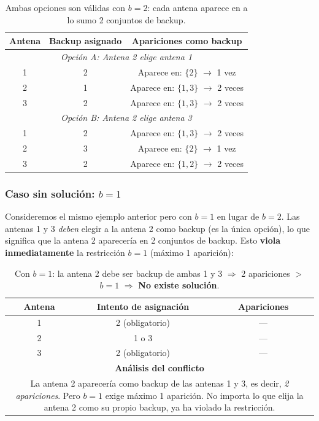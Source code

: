 \begin{table}[h]
\centering
\begin{tabular}{|c|c|c|}
\hline
\textbf{Antena} & \textbf{Backup asignado} & \textbf{Apariciones como backup} \\
\hline
\multicolumn{3}{|c|}{\textit{Opción A: Antena 2 elige antena 1}} \\
\hline
1 & 2 & Aparece en: $\{2\}$ $\rightarrow$ 1 vez \\
\hline
2 & 1 & Aparece en: $\{1, 3\}$ $\rightarrow$ 2 veces \\
\hline
3 & 2 & Aparece en: $\{1, 3\}$ $\rightarrow$ 2 veces \\
\hline
\multicolumn{3}{|c|}{\textit{Opción B: Antena 2 elige antena 3}} \\
\hline
1 & 2 & Aparece en: $\{1, 3\}$ $\rightarrow$ 2 veces \\
\hline
2 & 3 & Aparece en: $\{2\}$ $\rightarrow$ 1 vez \\
\hline
3 & 2 & Aparece en: $\{1, 2\}$ $\rightarrow$ 2 veces \\
\hline
\end{tabular}
\caption{Ambas opciones son válidas con $b=2$: cada antena aparece en a lo sumo 2 conjuntos de backup.}
\label{tab:ejemplo_soluciones}
\end{table}

\subsubsection{Caso sin solución: $b=1$}

Consideremos el mismo ejemplo anterior pero con $b=1$ en lugar de $b=2$. Las antenas 1 y 3 \textit{deben} elegir a la antena 2 como backup (es la única opción), lo que significa que la antena 2 aparecería en 2 conjuntos de backup. Esto \textbf{viola inmediatamente} la restricción $b=1$ (máximo 1 aparición):

\begin{table}[h]
\centering
\begin{tabular}{|c|c|c|}
\hline
\textbf{Antena} & \textbf{Intento de asignación} & \textbf{Apariciones} \\
\hline
1 & 2 (obligatorio) & --- \\
\hline
2 & 1 o 3 & --- \\
\hline
3 & 2 (obligatorio) & --- \\
\hline
\multicolumn{3}{|c|}{\textbf{Análisis del conflicto}} \\
\hline
\multicolumn{3}{|p{11cm}|}{
La antena 2 aparecería como backup de las antenas 1 y 3, es decir, \textit{2 apariciones}.
Pero $b=1$ exige máximo 1 aparición. No importa lo que elija la antena 2 como su propio backup,
ya ha violado la restricción.
} \\
\hline
\end{tabular}
\caption{Con $b=1$: la antena 2 debe ser backup de ambas 1 y 3 $\Rightarrow$ 2 apariciones $>$ $b=1$ $\Rightarrow$ \textbf{No existe solución}.}
\label{tab:ejemplo_sin_solucion}
\end{table}

